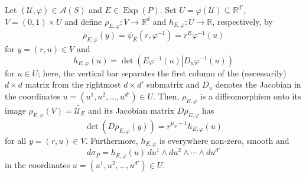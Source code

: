 \documentclass[smallextended]{svjour3}
\theoremstyle{remark}
\newcommand\Exp{\operatorname{Exp}}
\renewcommand\det{\operatorname{det}}
\begin{document}
\begin{lemma}\label{lem:JacobianRelation}
Let $(\mathcal{U},\varphi)\in \mathcal{A}(S)$ and $E\in\Exp(P)$. Set $U=\varphi(\mathcal{U})\subseteq\mathbb{R}^{d'}$, $V=(0,1)\times U$ and define $\rho_{E,\varphi}:V\to \mathbb{R}^d$ and $h_{E,\varphi}:U\to \mathbb{R}$, respectively, by
\begin{equation*}
    \rho_{E,\varphi}(y)=\psi_E(r,\varphi^{-1})=r^E\varphi^{-1}(u)
\end{equation*}
for $y=(r,u)\in V$ and
\begin{equation*}
    h_{E,\varphi}(u)=\det\left.\left(E\varphi^{-1}(u)\right\vert D_u\varphi^{-1}(u)\right)
\end{equation*}
for $u\in U$; here, the vertical bar separates the first column of the (necessarily) $d\times d$ matrix from the rightmost $d\times d'$ submatrix and $D_u$ denotes the Jacobian in the coordinates $u=(u^1,u^2,\dots,u^{d'})\in U$. Then, $\rho_{E,\varphi}$ is a diffeomorphism onto its image $\rho_{E,\varphi}(V)=\widetilde{\mathcal{U}_E}$ and its Jacobian matrix $D\rho_{E,\varphi}$ has
\begin{equation}\label{eq:JacobianRelation1}
    \det(D\rho_{E,\varphi}(y))=r^{\mu_P-1}h_{E,\varphi}(u)
\end{equation}
for all $y=(r,u)\in V$. Furthermore, $h_{E,\varphi}$ is everywhere non-zero, smooth and
\begin{equation}\label{eq:JacobianRelation2}
    d\sigma_P=h_{E,\varphi}(u)\,du^1\wedge du^2\wedge\cdots\wedge du^{d'}
\end{equation}
in the coordinates $u=(u^1,u^2,\dots,u^{d'})\in U$. 
\end{lemma}
\end{document}

